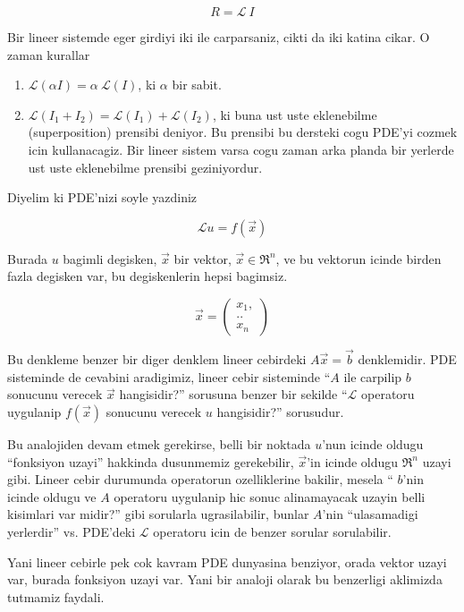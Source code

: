 \documentclass[12pt,fleqn]{article}
\begin{document}
\[ R = \mathcal{L} \ I \]

Bir lineer sistemde eger girdiyi iki ile carparsaniz, cikti da iki katina
cikar. O zaman kurallar

\begin{enumerate}

   \item $\mathcal{L}(\alpha I) = \alpha \ \mathcal{L}(I)$, ki $\alpha$ bir sabit.

   \item $\mathcal{L}(I_1 + I_2) = \mathcal{L}(I_1) + \mathcal{L}(I_2)$, ki buna ust uste eklenebilme
     (superposition) prensibi deniyor. Bu prensibi bu dersteki cogu PDE'yi
     cozmek icin kullanacagiz. Bir lineer sistem varsa cogu zaman arka
     planda bir yerlerde ust uste eklenebilme prensibi geziniyordur. 

\end{enumerate}

Diyelim ki PDE'nizi soyle yazdiniz

\[\mathcal{L}u = f(\vec{x}) \]

Burada $u$ bagimli degisken, $\vec{x}$ bir vektor, $\vec{x} \in \Re ^n$, ve
bu vektorun icinde birden fazla degisken var, bu degiskenlerin hepsi
bagimsiz.

\[ 
\vec{x} = 
\left(\begin{array}{r}
x_1,\\
.. \\
x_n
\end{array}\right)
 \]

Bu denkleme benzer bir diger denklem lineer cebirdeki $A\vec{x} = \vec{b}$
denklemidir.  PDE sisteminde de cevabini aradigimiz, lineer cebir
sisteminde ``$A$ ile carpilip $b$ sonucunu verecek $\vec{x}$ hangisidir?''
sorusuna benzer bir sekilde ``$\mathcal{L}$ operatoru uygulanip $f(\vec{x})$
sonucunu verecek $u$ hangisidir?'' sorusudur.

Bu analojiden devam etmek gerekirse, belli bir noktada $u$'nun icinde
oldugu ``fonksiyon uzayi'' hakkinda dusunmemiz gerekebilir, $\vec{x}$'in
icinde oldugu $\Re^n$ uzayi gibi. Lineer cebir durumunda operatorun
ozelliklerine bakilir, mesela `` $b$'nin icinde oldugu ve $A$ operatoru
uygulanip hic sonuc alinamayacak uzayin belli kisimlari var
midir?'' gibi sorularla ugrasilabilir, bunlar $A$'nin ``ulasamadigi
yerlerdir'' vs. PDE'deki $\mathcal{L}$ operatoru icin de benzer sorular sorulabilir. 

Yani lineer cebirle pek cok kavram PDE dunyasina benziyor, orada vektor
uzayi var, burada fonksiyon uzayi var. Yani bir analoji olarak bu
benzerligi aklimizda tutmamiz faydali. 
\end{document}
